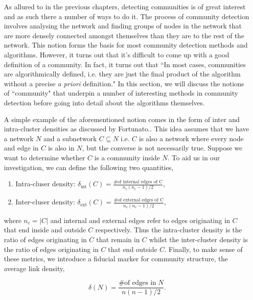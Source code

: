 As allured to in the previous chapters, detecting communities is of great interest and as such there a number of ways to do it. The process of community detection involves analysing the network and finding groups of nodes in the network that are more densely connected amongst themselves than they are to the rest of the network. This notion forms the basis for most community detection methods and algorithms. However, it turns out that it's difficult to come up with a good definition of a community. In fact, it turns out that ``In most cases, communities are algorithmically defined, i.e. they are just the final product of the algorithm without a precise \emph{a priori} definition."\cite[84]{fortunato} In this section, we will discuss the notions of ``community" that underpin a number of interesting methods in community detection before going into detail about the algorithms themselves.

A simple example of the aforementioned notion comes in the form of inter and intra-cluster densities as discussed by Fortunato.\cite[84]{fortunato}. This idea assumes that we have a network $N$ and a subnetwork $C \subseteq N$ i.e. $C$ is also a network where every node and edge in $C$ is also in $N$, but the converse is not necessarily true. Suppose we want to determine whether $C$ is a community inside $N$. To aid us in our investigation, we can define the following two quantities,

\begin{enumerate}
    \item Intra-cluser density: $\delta_{\text{int}}(C) = \frac{\text{\# of internal edges of C}}{n_c(n_c - 1)/2} $,
    \item Inter-cluser density: $\delta_{\text{ext}}(C) = \frac{\text{\# of external edges of C}}{n_c(n_c - 1)/2} $,
\end{enumerate}

where $n_c = |C|$ and internal and external edges refer to edges originating in $C$ that end inside and outside $C$ respectively. Thus the intra-cluster density is the ratio of edges originating in $C$ that remain in $C$ whilst the inter-cluster density is the ratio of edges originating in $C$ that end outside $C$. Finally, to make sense of these metrics, we introduce a fiducial marker for community structure, the average link density,

$$ \delta(N) = \frac{\text{\# of edges in}\; N}{n(n-1)/2}. $$

